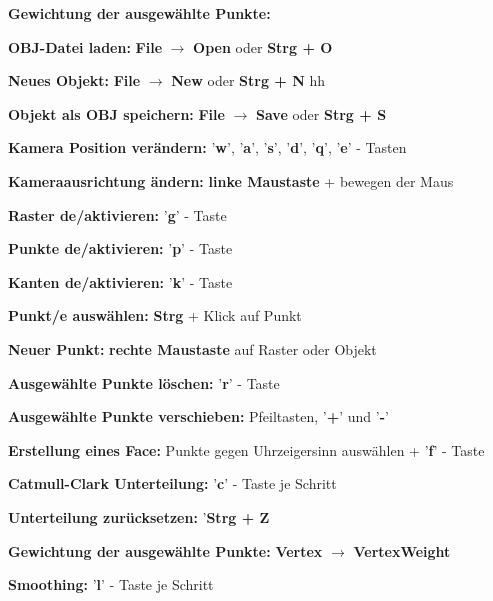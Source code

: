 	\begin{labeling}[]{\textbf{Gewichtung der ausgewählte Punkte:}}%
		\item [\textbf{OBJ-Datei laden:}] \textbf{File} $\rightarrow$ \textbf{Open} oder \textbf{Strg + O}
		\item [\textbf{Neues Objekt:}] \textbf{File} $\rightarrow$ \textbf{New} oder \textbf{Strg + N}
hh		\item [\textbf{Objekt als OBJ speichern:}] \textbf{File} $\rightarrow$ \textbf{Save} oder \textbf{Strg + S}
		\newline
		\item [\textbf{Kamera Position verändern:}] '\textbf{w}',  '\textbf{a}', '\textbf{s}', '\textbf{d}', '\textbf{q}', '\textbf{e}' - Tasten
		\item [\textbf{Kameraausrichtung ändern:}] \textbf{linke Maustaste} + bewegen der Maus
		\newline
		\item [\textbf{Raster de/aktivieren:}] '\textbf{g}' - Taste
		\item [\textbf{Punkte de/aktivieren:}] '\textbf{p}' - Taste
		\item [\textbf{Kanten de/aktivieren:}] '\textbf{k}' - Taste
		\newline
		\item [\textbf{Punkt/e auswählen:}] \textbf{Strg} + Klick auf Punkt
		\item [\textbf{Neuer Punkt:}] \textbf{rechte Maustaste} auf Raster oder Objekt
		\item [\textbf{Ausgewählte Punkte löschen:}] '\textbf{r}' - Taste
		\item [\textbf{Ausgewählte Punkte verschieben:}] Pfeiltasten, '\textbf{+}' und  '\textbf{-}'
		\newline
		\item [\textbf{Erstellung eines Face:}] Punkte gegen Uhrzeigersinn auswählen +  '\textbf{f}' - Taste
		\newline
		\item [\textbf{Catmull-Clark Unterteilung:}]  '\textbf{c}' - Taste je Schritt
		\item [\textbf{Unterteilung zurücksetzen:}] '\textbf{Strg + Z}
		\newline
		\item [\textbf{Gewichtung der ausgewählte Punkte:}] \textbf{Vertex} $\rightarrow$ \textbf{VertexWeight}
		\newline
		\item [\textbf{Smoothing:}]  '\textbf{l}' - Taste je Schritt
	\end{labeling}
		
